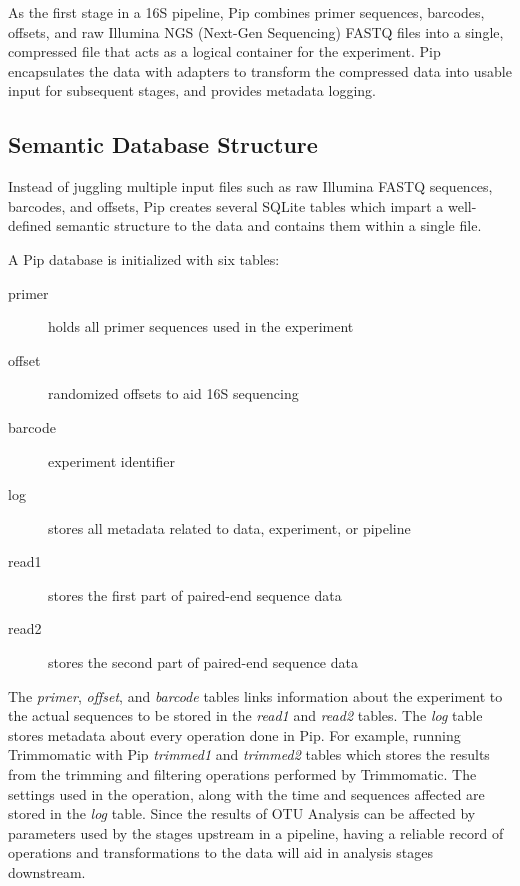 \documentclass[12pt]{article}
\begin{document}
	As the first stage in a 16S pipeline, Pip combines primer sequences, barcodes, 
	offsets, and raw Illumina NGS (Next-Gen Sequencing) FASTQ files into a single, 
	compressed file that acts as a logical container for the experiment. Pip 
	encapsulates the data with adapters to transform the compressed data into 
	usable input for subsequent stages, and provides metadata logging.

	\subsection{Semantic Database Structure} %
	\label{sub:semantic_database_structure}
	Instead of juggling multiple input files such as raw Illumina FASTQ sequences,
	barcodes, and offsets, Pip creates several SQLite tables which impart a well-defined
	semantic structure to the data and contains them within a single file.
	
	A Pip database is initialized with six tables:
	
	\begin{description}
		\item[primer] holds all primer sequences used in the experiment
		\item[offset] randomized offsets to aid 16S sequencing
		\item[barcode] experiment identifier
		\item[log] stores all metadata related to data, experiment, or pipeline
		\item[read1] stores the first part of paired-end sequence data
		\item[read2] stores the second part of paired-end sequence data
	\end{description}
	
	The \emph{primer}, \emph{offset}, and \emph{barcode} tables links information 
	about the experiment to the actual sequences to be stored in the \emph{read1} 
	and \emph{read2} tables. The \emph{log} table stores metadata about every 
	operation done in Pip. For example, running Trimmomatic with Pip \emph{trimmed1} and \emph{trimmed2} 
	tables which stores the results from the trimming and filtering operations performed 
	by Trimmomatic. The settings used in the operation, along with the time and sequences affected
	are stored in the \emph{log} table. Since the results of OTU Analysis can be 
	affected by parameters used by the stages upstream in a pipeline, having a 
	reliable record of operations and transformations to the data will aid in 
	analysis stages downstream.
\end{document}
